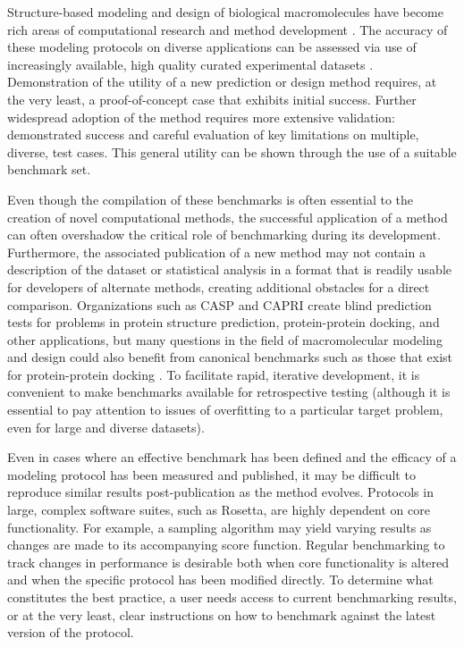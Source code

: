 Structure-based modeling and design of biological macromolecules have become rich areas of computational research and method development \cite{leaver-fay_rosetta3:_2011,webb_comparative_2002,brooks_charmm:_2009,case_amber_2005,jorgensen_development_1996}. The accuracy of these modeling protocols on diverse applications can be assessed via use of increasingly available, high quality curated experimental datasets \cite{berman_protein_2000,kumar_protherm_2006,bento_chembl_2014,moal_skempi:_2012,mintseris_proteinprotein_2005}. Demonstration of the utility of a new prediction or design method requires, at the very least, a proof-of-concept case that exhibits initial success. Further widespread adoption of the method requires more extensive validation: demonstrated success and careful evaluation of key limitations on multiple, diverse, test cases. This general utility can be shown through the use of a suitable benchmark set.

Even though the compilation of these benchmarks is often essential to the creation of novel computational methods, the successful application of a method can often overshadow the critical role of benchmarking during its development. Furthermore, the associated publication of a new method may not contain a description of the dataset or statistical analysis in a format that is readily usable for developers of alternate methods, creating additional obstacles for a direct comparison. Organizations such as CASP \cite{moult_critical_2014} and CAPRI \cite{janin_third_2007} create blind prediction tests for problems in protein structure prediction, protein-protein docking, and other applications, but many questions in the field of macromolecular modeling and design could also benefit from canonical benchmarks such as those that exist for protein-protein docking \cite{mintseris_proteinprotein_2005,moult_critical_2014,janin_third_2007,hwang_proteinprotein_2010}. To facilitate rapid, iterative development, it is convenient to make benchmarks available for retrospective testing (although it is essential to pay attention to issues of overfitting to a particular target problem, even for large and diverse datasets).

Even in cases where an effective benchmark has been defined and the efficacy of a modeling protocol has been measured and published, it may be difficult to reproduce similar results post-publication as the method evolves. Protocols in large, complex software suites, such as Rosetta, are highly dependent on core functionality. For example, a sampling algorithm may yield varying results as changes are made to its accompanying score function. Regular benchmarking to track changes in performance is desirable both when core functionality is altered and when the specific protocol has been modified directly. To determine what constitutes the best practice, a user needs access to current benchmarking results, or at the very least, clear instructions on how to benchmark against the latest version of the protocol.


